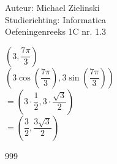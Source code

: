 \documentclass[a4paper]{article}
\begin{document}
  
\noindent \large Auteur: Michael Zielinski \\
\noindent \large Studierichting: Informatica\\
\noindent \large Oefeningenreeks 1C nr. 1.3\\

\medskip

\normalsize

$\left(3, \dfrac{7\pi}{3}\right)$\\

$\left(3 \cos\left(\dfrac{7\pi}{3}\right), 3 \sin\left(\dfrac{7\pi}{3}\right)\right)$\\

$=\left(3 \cdot \dfrac{1}{2}, 3 \cdot \dfrac{\sqrt{3}}{2}\right)$\\

$=\left(\dfrac{3}{2}, \dfrac{3\sqrt{3}}{2}\right)$

\begin{thebibliography}{999}
\end{thebibliography}
\end{document}
